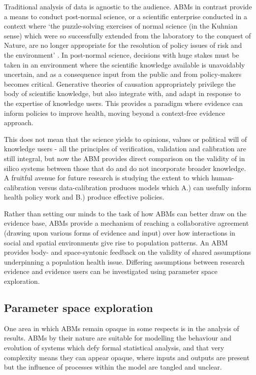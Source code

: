\documentclass[review]{elsarticle}
\begin{document}
Traditional analysis of data is agnostic to the audience. ABMs in contrast provide a means to conduct post-normal science, or a scientific enterprise conducted in a context where `the puzzle-solving exercises of normal science (in the Kuhnian sense)  which were so successfully extended from the laboratory to the conquest of Nature, are no longer appropriate for the resolution of policy issues of risk and the environment' \citep[][p. 750]{funtowicz1993}.  In post-normal science, decisions with huge stakes must be taken in an environment where the scientific knowledge available is unavoidably uncertain, and as a consequence input from the public and from policy-makers becomes critical. Generative theories of causation appropriately privilege the body of scientific knowledge, but also integrate with, and adapt in response to the expertise of knowledge users. This provides a paradigm where evidence can inform policies to improve health, moving beyond a context-free evidence approach. 

This does not mean that the science yields to opinions, values or political will of knowledge users - all the principles of verification, validation and calibration are still integral, but now the ABM provides direct comparison on the validity of in silico systems between those that do and do not incorporate broader knowledge. A fruitful avenue for future research is studying the extent to which human-calibration versus data-calibration produces models which A.) can usefully inform health policy work and B.) produce effective policies.

Rather than setting our minds to the task of how ABMs can better draw on the evidence base,  ABMs provide a mechanism of reaching a collaborative agreement (drawing upon various forms of evidence and input) over how interactions in social and spatial environments give rise to population patterns. An ABM provides body- and space-syntonic feedback on the validity of shared assumptions underpinning a population health issue. Differing assumptions between research evidence and evidence users can be investigated using parameter space exploration.

\subsection{Parameter space exploration}

One area in which ABMs remain opaque in some respects is in the analysis of results.  ABMs by their nature are suitable for modelling the behaviour and evolution of systems which defy formal statistical analysis, and that very complexity means they can appear opaque, where inputs and outputs are present but the influence of processes within the model are tangled and unclear.
\end{document}
